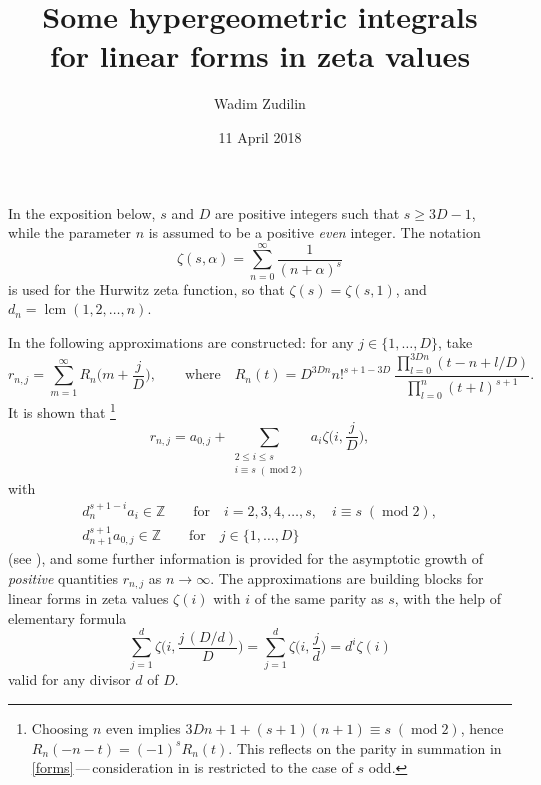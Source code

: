 \documentclass[12pt,reqno]{amsart}
\renewcommand{\pmod}[1]{\;(\operatorname{mod}#1)}
\begin{document}
\title[Hypergeometric integrals for zeta values]{Some hypergeometric integrals\\for linear forms in zeta values}

\author{Wadim Zudilin}
\address{Department of Mathematics, IMAPP, Radboud University, PO Box 9010, 6500~GL Nijmegen, Netherlands}



\date{11 April 2018}

\maketitle

In the exposition below, $s$ and $D$ are positive integers such that $s\ge3D-1$,
while the parameter $n$ is assumed to be a positive \emph{even} integer. The notation
$$
\zeta(s,\alpha) = \sum_{n=0}^\infty \frac1{(n+\alpha)^s}
$$
is used for the Hurwitz zeta function, so that $\zeta(s)=\zeta(s,1)$, and
$d_n = \operatorname{lcm}(1,2,\dots,n)$.

In \cite{FSZ18} the following approximations are constructed: for any $j\in\{1,\dots,D\}$, take
$$
r_{n,j} = \sum_{m=1}^\infty R_n\bigg(m+\frac{j}{D}\bigg),
\qquad\text{where}\quad
R_n(t) = D^{3Dn} n!^{s+1-3D} \, \frac{ \prod_{l=0}^{3Dn} (t-n+l/D)}{ \prod_{l=0}^n (t+l)^{s+1}}.
$$
It is shown that%
\footnote{Choosing $n$ even implies $3Dn+1+(s+1)(n+1)\equiv s\pmod2$, hence $R_n(-n-t)=(-1)^sR_n(t)$.
This reflects on the parity in summation in \eqref{forms}\,---\,consideration in \cite{FSZ18} is restricted to the case of $s$ odd.}
\begin{equation}
\label{forms}
r_{n,j} 
=a_{0,j}+\sum_{\substack{2\le i \le s\\i\equiv s\pmod2}}a_i\zeta\bigg(i,\frac{j}{D}\bigg),
\end{equation}
with
\begin{equation*}
\begin{gathered}
d_n^{s+1-i}a_i\in\mathbb Z \qquad\text{for}\quad i = 2,3,4,\dots,s, \quad i\equiv s\pmod2,
\\
d_{n+1}^{s+1}a_{0,j}\in\mathbb Z \qquad\text{for}\quad j\in \{1,\dots,D\}
\end{gathered}
\end{equation*}
(see \cite[Lemmas 1 and 2]{FSZ18}), and some further information is provided for the asymptotic growth of \emph{positive} quantities $r_{n,j}$ as $n\to\infty$. The approximations are building blocks for linear forms in zeta values $\zeta(i)$ with $i$ of the same parity as $s$, with the help of elementary formula
$$
\sum_{j=1}^d\zeta\biggl(i,\frac{j\,(D/d)}{D}\biggr)=\sum_{j=1}^d\zeta\biggl(i,\frac jd\biggr)=d^i\zeta(i)
$$
valid for any divisor $d$ of $D$.
\end{document}
